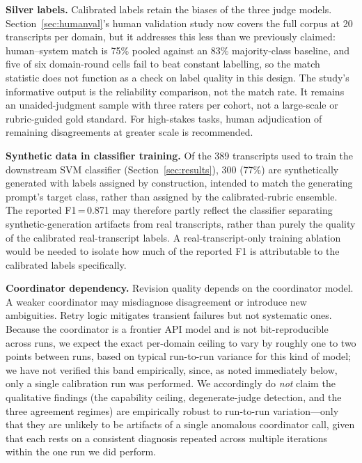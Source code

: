 \documentclass[11pt]{article}
\begin{document}
\textbf{Silver labels.} Calibrated labels retain the biases of the three judge
models. Section~\ref{sec:humanval}'s human validation study now covers the full
corpus at 20 transcripts per domain, but it addresses this less than we
previously claimed: human--system match is 75\% pooled against an 83\%
majority-class baseline, and five of six domain-round cells fail to beat
constant labelling, so the match statistic does not function as a check on
label quality in this design. The study's informative output is the
reliability comparison, not the match rate. It remains an unaided-judgment
sample with three raters per cohort, not a large-scale or rubric-guided
gold standard. For high-stakes tasks, human
adjudication of remaining disagreements at greater scale is recommended.

\textbf{Synthetic data in classifier training.} Of the 389 transcripts used
to train the downstream SVM classifier (Section~\ref{sec:results}), 300
(77\%) are synthetically generated with labels assigned by construction,
intended to match the generating prompt's target class, rather than
assigned by the calibrated-rubric ensemble. The reported
F1\,=\,0.871 may therefore partly reflect the classifier separating
synthetic-generation artifacts from real transcripts, rather than purely
the quality of the calibrated real-transcript labels. A real-transcript-only
training ablation would be needed to isolate how much of the reported F1 is
attributable to the calibrated labels specifically.

\textbf{Coordinator dependency.} Revision quality depends on the coordinator
model. A weaker coordinator may misdiagnose disagreement or introduce new
ambiguities. Retry logic mitigates transient failures but not systematic ones.
Because the coordinator is a frontier API model and is not bit-reproducible across runs, we
expect the exact per-domain ceiling to vary by roughly one to two points between runs, based on
typical run-to-run variance for this kind of model; we have not verified this band empirically,
since, as noted immediately below, only a single calibration run was performed. We accordingly
do \emph{not} claim the qualitative findings (the capability ceiling, degenerate-judge detection,
and the three agreement regimes) are empirically robust to run-to-run variation---only that they
are unlikely to be artifacts of a single anomalous coordinator call, given that each rests on a
consistent diagnosis repeated across multiple iterations within the one run we did perform.
\end{document}
